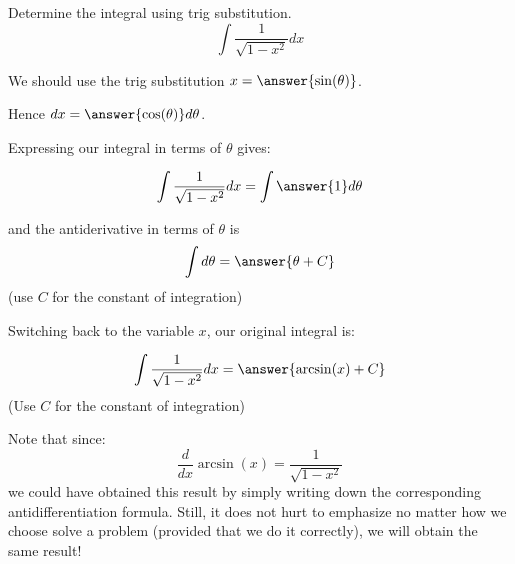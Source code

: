 \documentclass{ximera}
\author{Jason Miller}
\begin{document}
\begin{exercise}
Determine the integral using trig substitution. 
\[
\int \frac{1}{\sqrt{1-x^{2}}} dx
\]

We should use the trig substitution $x=\answer{ \sin(\theta)}$. 

Hence $dx=\answer{ \cos(\theta) } d\theta$.

Expressing our integral in terms of $\theta$ gives:

\begin{exercise}

\[
\int \frac{1}{\sqrt{1-x^{2}}} dx=\int \answer{ 1  }  d\theta 
\]


and the antiderivative in terms of $\theta$ is 
\[
\int d\theta = \answer{ \theta + C}
\]
(use $C$ for the constant of integration)

\begin{exercise}
Switching back to the variable $x$, our original integral is:

\[
\int \frac{1}{\sqrt{1-x^{2}}} dx= \answer{ \arcsin(x) + C }
\]
(Use $C$ for the constant of integration)

\begin{feedback}
Note that since:
\[
\frac{d}{dx} \arcsin(x)=\frac{1}{\sqrt{1-x^{2}}}
\]
we could have obtained this result by simply writing down the corresponding antidifferentiation formula.  Still, it does not hurt to emphasize no matter how we choose solve a problem (provided that we do it correctly), we will obtain the same result!

\end{feedback}
\end{exercise}
\end{exercise}
\end{exercise}
\end{document}
